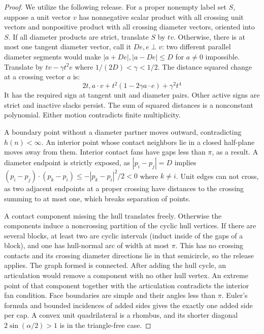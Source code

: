 \documentclass[10pt,reqno]{amsart}
\begin{document}
\begin{proof}
    We utilize the following release. For a proper nonempty label set $S$, suppose a unit vector $v$ has nonnegative scalar product with all crossing unit vectors and nonpositive product with all crossing diameter vectors, oriented into $S$. If all diameter products are strict, translate $S$ by $tv$. Otherwise, there is at most one tangent diameter vector, call it $De, e \perp v$: two different parallel diameter segments would make $|a + De|, |a - De| \le D$ for $a \ne 0$ impossible. Translate by $tv - \gamma t^2 e$ where $1 / (2D) < \gamma < 1/2$. The distance squared change at a crossing vector $a$ is:
    \begin{equation}
        2t, a \cdot v + t^2 (1 - 2 \gamma a \cdot e) + \gamma^2 t^4
    \end{equation}
    It has the required sign at tangent unit and diameter pairs. Other active signs are strict and inactive slacks persist. The sum of squared distances is a nonconstant polynomial. Either motion contradicts finite multiplicity.

    A boundary point without a diameter partner moves outward, contradicting $h(n) < \infty$. An interior point whose contact neighbors lie in a closed half-plane moves away from them. Interior contact fans have gaps less than $\pi$, as a result. A diameter endpoint is strictly exposed, as $|p_i - p_j| = D$ implies $(p_i - p_j) \cdot (p_k - p_i) \le - |p_k - p_i|^2 / 2 < 0$ where $k \ne i$. Unit edges can not cross, as two adjacent endpoints at a proper crossing have distances to the crossing summing to at most one, which breaks separation of points.

    A contact component missing the hull translates freely. Otherwise the components induce a noncrossing partition of the cyclic hull vertices. If there are several blocks, at least two are cyclic intervals (induct inside of the gaps of a block), and one has hull-normal arc of width at most $\pi$. This has no crossing contacts and its crossing diameter directions lie in that semicircle, so the release applies. The graph formed is connected. After adding the hull cycle, an articulation would remove a component with no other hull vertex. An extreme point of that component together with the articulation contradicts the interior fan condition. Face boundaries are simple and their angles less than $\pi$. Euler's formula and bounded incidences of added sides gives the exactly one added side per cap. A convex unit quadrilateral is a rhombus, and its shorter diagonal $2 \sin (\alpha / 2) > 1$ is in the triangle-free case.
\end{proof}
\end{document}
